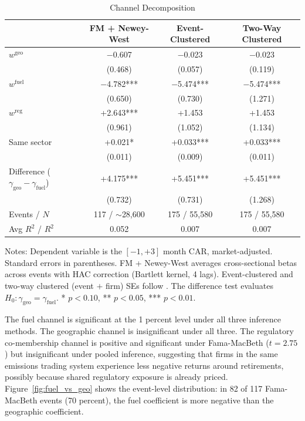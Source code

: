 \documentclass[12pt,a4paper]{article}
\begin{document}
\begin{table}[H]
\centering
\caption{Channel Decomposition}
\label{tab:channel_decomp}
\begin{tabular}{lccc}
\toprule
 & FM + Newey-West & Event-Clustered & Two-Way Clustered \\
\midrule
$w^{\text{geo}}$ & $-$0.607 & $-$0.023 & $-$0.023 \\
 & (0.468) & (0.057) & (0.119) \\[4pt]
$w^{\text{fuel}}$ & $-$4.782*** & $-$5.474*** & $-$5.474*** \\
 & (0.650) & (0.730) & (1.271) \\[4pt]
$w^{\text{reg}}$ & +2.643*** & +1.453 & +1.453 \\
 & (0.961) & (1.052) & (1.134) \\[4pt]
Same sector & +0.021* & +0.033*** & +0.033*** \\
 & (0.011) & (0.009) & (0.011) \\[4pt]
\midrule
Difference ($\gamma_{\text{geo}} - \gamma_{\text{fuel}}$) & +4.175*** & +5.451*** & +5.451*** \\
 & (0.732) & (0.731) & (1.268) \\
\midrule
Events / $N$ & 117 / $\sim$28,600 & 175 / 55,580 & 175 / 55,580 \\
Avg $R^2$ / $R^2$ & 0.052 & 0.007 & 0.007 \\
\bottomrule
\end{tabular}
\begin{flushleft}\footnotesize
Notes: Dependent variable is the $[-1, +3]$ month CAR, market-adjusted. Standard errors in parentheses. FM + Newey-West averages cross-sectional betas across events with HAC correction (Bartlett kernel, 4 lags). Event-clustered and two-way clustered (event $+$ firm) SEs follow \citet{CameronGelbachMiller2011}. The difference test evaluates $H_0\!: \gamma_{\text{geo}} = \gamma_{\text{fuel}}$. * $p<0.10$, ** $p<0.05$, *** $p<0.01$.
\end{flushleft}
\end{table}

The fuel channel is significant at the 1 percent level under all three inference methods. The geographic channel is insignificant under all three. The regulatory co-membership channel is positive and significant under Fama-MacBeth ($t = 2.75$) but insignificant under pooled inference, suggesting that firms in the same emissions trading system experience less negative returns around retirements, possibly because shared regulatory exposure is already priced. Figure~\ref{fig:fuel_vs_geo} shows the event-level distribution: in 82 of 117 Fama-MacBeth events (70 percent), the fuel coefficient is more negative than the geographic coefficient.
\end{document}
